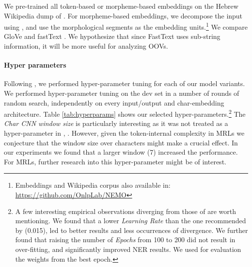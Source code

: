 \documentclass[11pt,a4paper]{article}
\begin{document}
We pre-trained all  token-based or morpheme-based embeddings on the  Hebrew Wikipedia dump of . For morpheme-based embeddings, 
we  decompose the input using  , and use the morphological segments as the embedding units.\footnote{Embeddings and Wikipedia corpus also available in: \scriptsize{\url{https://github.com/OnlpLab/NEMO}}} 
We compare GloVe \cite{pennington-etal-2014-glove} and fastText \cite{bojanowski2017enriching}. 
We hypothesize  that since FastText uses sub-string information, it will be more useful for analyzing OOVs.

 \paragraph{Hyper parameters}
Following , we performed hyper-parameter tuning for each of our model variants. We performed hyper-parameter tuning on the dev set in a number of rounds of random search, independently on every input/output and char-embedding architecture. 
Table \ref{tab:hyperparams} shows our selected hyper-parameters.\footnote{A few interesting
empirical observations diverging from those of \citet{DBLP:journals/corr/ReimersG17,yang2018design} are worth mentioning. 
We found that a lower {\em Learning Rate} than the one  recommended by \citet{yang2018design} (0.015), led to better results and less occurrences of divergence.
We further found that raising the number of {\em Epochs} from 100 to 200 did not result in over-fitting, and significantly improved NER results. We used for evaluation the weights from the best epoch.}
The {\em Char CNN window size} is particularly interesting as it was not treated as a hyper-parameter in  \citet{DBLP:journals/corr/ReimersG17}, \citet{yang2018design}. 
However, given the token-internal complexity in MRLs we conjecture that the window size over characters might make a crucial effect. In our experiments we found that  a larger window (7)  increased the performance. For MRLs,  further research into this  hyper-parameter  might be of interest.
\end{document}
